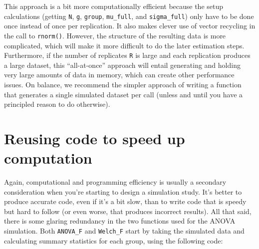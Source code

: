 \documentclass[
]{book}
\newenvironment{Shaded}{\begin{snugshade}}{\end{snugshade}}
\newcommand{\FunctionTok}[1]{\textcolor[rgb]{0.00,0.00,0.00}{#1}}
\newcommand{\NormalTok}[1]{#1}
\newcommand{\OtherTok}[1]{\textcolor[rgb]{0.56,0.35,0.01}{#1}}
\newcommand{\SpecialCharTok}[1]{\textcolor[rgb]{0.00,0.00,0.00}{#1}}
\begin{document}
This approach is a bit more computationally efficient because the setup calculations (getting \texttt{N}, \texttt{g}, \texttt{group}, \texttt{mu\_full}, and \texttt{sigma\_full}) only have to be done once instead of once per replication. It also makes clever use of vector recycling in the call to \texttt{rnorm()}. However, the structure of the resulting data is more complicated, which will make it more difficult to do the later estimation steps.
Furthermore, if the number of replicates \texttt{R} is large and each replication produces a large dataset, this ``all-at-once'' approach will entail generating and holding very large amounts of data in memory, which can create other performance issues.
On balance, we recommend the simpler approach of writing a function that generates a single simulated dataset per call (unless and until you have a principled reason to do otherwise).

\hypertarget{reusing-code-to-speed-up-computation}{%
\section{Reusing code to speed up computation}\label{reusing-code-to-speed-up-computation}}

Again, computational and programming efficiency is usually a secondary consideration when you're starting to design a simulation study.
It's better to produce accurate code, even if it's a bit slow, than to write code that is speedy but hard to follow (or even worse, that produces incorrect results).
All that said, there is some glaring redundancy in the two functions used for the ANOVA simulation.
Both \texttt{ANOVA\_F} and \texttt{Welch\_F} start by taking the simulated data and calculating summary statistics for each group, using the following code:

\begin{Shaded}
\end{Shaded}
\end{document}

